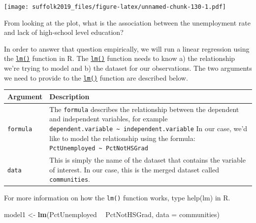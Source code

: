 \documentclass[]{article}
\newenvironment{Shaded}{\begin{snugshade}}{\end{snugshade}}
\newcommand{\DataTypeTok}[1]{\textcolor[rgb]{0.13,0.29,0.53}{#1}}
\newcommand{\KeywordTok}[1]{\textcolor[rgb]{0.13,0.29,0.53}{\textbf{#1}}}
\newcommand{\NormalTok}[1]{#1}
\newcommand{\OperatorTok}[1]{\textcolor[rgb]{0.81,0.36,0.00}{\textbf{#1}}}
\newcommand{\StringTok}[1]{\textcolor[rgb]{0.31,0.60,0.02}{#1}}
\begin{document}
\texttt{[image: suffolk2019\_files/figure-latex/unnamed-chunk-130-1.pdf]}

From looking at the plot, what is the association between the unemployment rate and lack of high-school level education?

In order to answer that question empirically, we will run a linear regression using the \href{http://bit.ly/R_lm}{\texttt{lm()}} function in R. The \href{http://bit.ly/R_lm}{\texttt{lm()}} function needs to know a) the relationship we're trying to model and b) the dataset for our observations. The two arguments we need to provide to the \href{http://bit.ly/R_lm}{\texttt{lm()}} function are described below.

\begin{longtable}[]{@{}ll@{}}
\toprule
\begin{minipage}[b]{0.11\columnwidth}\raggedright
Argument\strut
\end{minipage} & \begin{minipage}[b]{0.83\columnwidth}\raggedright
Description\strut
\end{minipage}\tabularnewline
\midrule
\endhead
\begin{minipage}[t]{0.11\columnwidth}\raggedright
\texttt{formula}\strut
\end{minipage} & \begin{minipage}[t]{0.83\columnwidth}\raggedright
The \texttt{formula} describes the relationship between the dependent and independent variables, for example \texttt{dependent.variable\ \textasciitilde{}\ independent.variable} In our case, we'd like to model the relationship using the formula: \texttt{PctUnemployed\ \textasciitilde{}\ PctNotHSGrad}\strut
\end{minipage}\tabularnewline
\begin{minipage}[t]{0.11\columnwidth}\raggedright
\texttt{data}\strut
\end{minipage} & \begin{minipage}[t]{0.83\columnwidth}\raggedright
This is simply the name of the dataset that contains the variable of interest. In our case, this is the merged dataset called \texttt{communities}.\strut
\end{minipage}\tabularnewline
\bottomrule
\end{longtable}

For more information on how the \texttt{lm()} function works, type help(lm) in R.

\begin{Shaded}
\begin{Highlighting}[]
\NormalTok{model1 <-}\StringTok{ }\KeywordTok{lm}\NormalTok{(PctUnemployed }\OperatorTok{~}\StringTok{ }\NormalTok{PctNotHSGrad, }\DataTypeTok{data =}\NormalTok{ communities)}
\end{Highlighting}
\end{Shaded}
\end{document}
